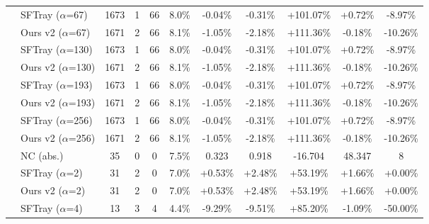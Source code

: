 \begin{table}[t]
{\begin{tabular}{ll|cccc|ccc|cc}
\addlinespace[0.3em]

 & SFTray ($\alpha$=67) & 1673 & 1 & 66 & 8.0\% & -0.04\% & -0.31\% & +101.07\% & +0.72\% & -8.97\% \\

 & Ours v2 ($\alpha$=67) & 1671 & 2 & 66 & 8.1\% & -1.05\% & -2.18\% & +111.36\% & -0.18\% & -10.26\% \\

\addlinespace[0.3em]

 & SFTray ($\alpha$=130) & 1673 & 1 & 66 & 8.0\% & -0.04\% & -0.31\% & +101.07\% & +0.72\% & -8.97\% \\

 & Ours v2 ($\alpha$=130) & 1671 & 2 & 66 & 8.1\% & -1.05\% & -2.18\% & +111.36\% & -0.18\% & -10.26\% \\

\addlinespace[0.3em]

 & SFTray ($\alpha$=193) & 1673 & 1 & 66 & 8.0\% & -0.04\% & -0.31\% & +101.07\% & +0.72\% & -8.97\% \\

 & Ours v2 ($\alpha$=193) & 1671 & 2 & 66 & 8.1\% & -1.05\% & -2.18\% & +111.36\% & -0.18\% & -10.26\% \\

\addlinespace[0.3em]

 & SFTray ($\alpha$=256) & 1673 & 1 & 66 & 8.0\% & -0.04\% & -0.31\% & +101.07\% & +0.72\% & -8.97\% \\

 & Ours v2 ($\alpha$=256) & 1671 & 2 & 66 & 8.1\% & -1.05\% & -2.18\% & +111.36\% & -0.18\% & -10.26\% \\

\addlinespace[0.3em]

\midrule

\multirow{25}{*}{gcd} & NC (abs.) & 35 & 0 & 0 & 7.5\% & 0.323 & 0.918 & -16.704 & 48.347 & 8 \\

\addlinespace[0.4em]

 & SFTray ($\alpha$=2) & 31 & 2 & 0 & 7.0\% & +0.53\% & +2.48\% & +53.19\% & +1.66\% & +0.00\% \\

 & Ours v2 ($\alpha$=2) & 31 & 2 & 0 & 7.0\% & +0.53\% & +2.48\% & +53.19\% & +1.66\% & +0.00\% \\

\addlinespace[0.3em]

 & SFTray ($\alpha$=4) & 13 & 3 & 4 & 4.4\% & -9.29\% & -9.51\% & +85.20\% & -1.09\% & -50.00\% \\


\end{tabular}}
\end{table}
